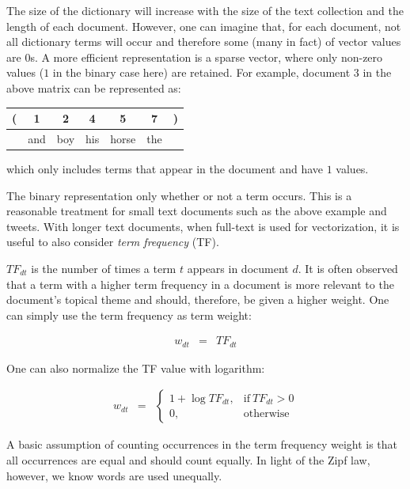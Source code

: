 \documentclass[
  letterpaper,
]{scrbook}
\newcounter{none} %
\begin{document}
\protect{}\label{tab-text-binary}{}

The size of the dictionary will increase with the size of the text
collection and the length of each document. However, one can imagine
that, for each document, not all dictionary terms will occur and
therefore some (many in fact) of vector values are \(0\)s. A more
efficient representation is a sparse vector, where only non-zero values
(\(1\) in the binary case here) are retained. For example, document
\(3\) in the above matrix can be represented as:

{\def\LTcaptype{none} %
\begin{longtable}[]{@{}ccccccc@{}}
\toprule\noalign{}
( & 1 & 2 & 4 & 5 & 7 & ) \\
\midrule\noalign{}
\endhead
\bottomrule\noalign{}
\endlastfoot
& and & boy & his & horse & the & \\
\end{longtable}
}

which only includes terms that appear in the document and have \(1\)
values.

The binary representation only whether or not a term occurs. This is a
reasonable treatment for small text documents such as the above example
and tweets. With longer text documents, when full-text is used for
vectorization, it is useful to also consider \emph{term frequency} (TF).

\(TF_{dt}\) is the number of times a term \(t\) appears in document
\(d\). It is often observed that a term with a higher term frequency in
a document is more relevant to the document's topical theme and should,
therefore, be given a higher weight. One can simply use the term
frequency as term weight:

\[\begin{aligned}
  w_{dt} & = & TF_{dt}
\end{aligned}\]

One can also normalize the TF value with logarithm:

\[\begin{aligned}
  w_{dt} & = &
\begin{cases}
  1 + \log TF_{dt}, & \text{if}\ TF_{dt}>0 \\
  0, & \text{otherwise}
\end{cases}
\end{aligned}\]

A basic assumption of counting occurrences in the term frequency weight
is that all occurrences are equal and should count equally. In light of
the Zipf law, however, we know words are used unequally.
\end{document}
